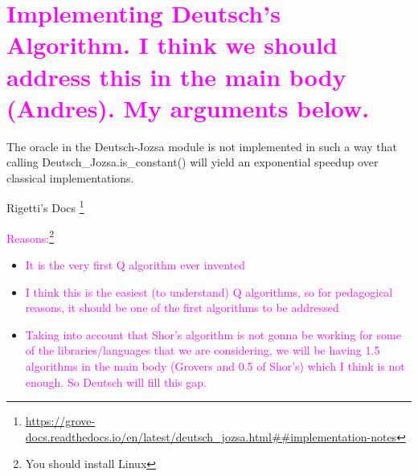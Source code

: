 \begin{comment}
The circuit diagram for Deutsch-Jozsa algorithm for a general n-qubit case looks like:

\begin{equation*}
\Qcircuit @C=2.14em @R=1.25em
{\lstick{\ket{0}} & \gate{H} & \multigate{5}{U_f} & \gate{H} & \meter \\
\lstick{\ket{0}} & \gate{H} & \ghost{U_f} & \gate{H} & \meter \\ 
& \dot{} & & \dot{} \\
& \dot{} & & \dot{} \\
& \dot{} & & \dot{} \\
\lstick{\ket{0}} & \gate{H} & \ghost{U_f} & \gate{H} & \meter \\}
\end{equation*}

\end{comment}

\section{\textcolor{magenta}{Implementing Deutsch's Algorithm. I think we should address this in the main body (Andres). My arguments below. }}
\epigraph{The oracle in the Deutsch-Jozsa module is not implemented in such a way that calling Deutsch\_Jozsa.is\_constant() will yield an exponential speedup over classical implementations.}{Rigetti's Docs \footnote{\url{https://grove-docs.readthedocs.io/en/latest/deutsch\_jozsa.html##implementation-notes}} }

\textcolor{magenta}{Reasons:\footnote{You should install Linux}}
\begin{itemize}
    \item \textcolor{magenta}{It is the very first Q algorithm ever invented}
    \item \textcolor{magenta}{I think this is the easiest (to understand) Q algorithms, so for pedagogical reasons, it should be one of the first algorithms to be addressed}
    \item \textcolor{magenta}{Taking into account that Shor's algorithm is not gonna be working for some of the libraries/languages that we are considering, we will be having 1.5 algorithms in the main body (Grovers and 0.5 of Shor's) which I think is not enough. So Deutsch will fill this gap.}
\end{itemize}

